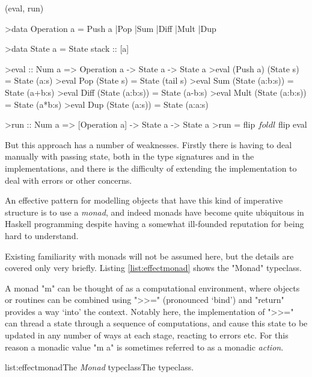 \functions(eval, run)
\begin{haskell}

>data Operation a = Push a |Pop |Sum |Diff |Mult |Dup

>data State a = State {stack :: [a]}

>eval :: Num a => Operation a -> State a -> State a
>eval (Push a) (State s) = State (a:s)
>eval Pop  (State s) = State (tail s)
>eval Sum  (State (a:b:s)) = State (a+b:s)
>eval Diff (State (a:b:s)) = State (a-b:s)
>eval Mult (State (a:b:s)) = State (a*b:s)
>eval Dup  (State (a:s)) = State (a:a:s)

>run :: Num a => [Operation a] -> State a -> State a
>run = flip $ foldl $ flip eval

\end{haskell}
\noindent But this approach has a number of weaknesses. Firstly there is having to deal manually with passing state, both in the type signatures and in the implementations, and there is the difficulty of extending the implementation to deal with errors or other concerns.

An effective pattern for modelling objects that have this kind of imperative structure is to use a \emph{monad}, and indeed monads have become quite ubiquitous in Haskell programming despite having a somewhat ill-founded reputation for being hard to understand.

Existing familiarity with monads will not be assumed here, but the details are covered only very briefly. Listing \ref{list:effectmonad} shows the "Monad" typeclass.

A monad "m" can be thought of as a computational environment, where objects or routines can be combined using ">>=" (pronounced `bind') and "return" provides a way `into' the context. Notably here, the implementation of ">>=" can thread a state through a sequence of computations, and cause this state to be updated in any number of ways at each stage, reacting to errors etc. For this reason a monadic value "m a" is sometimes referred to as a monadic \emph{action}.

\vspace{-0.5em}
\begin{listing}{list:effectmonad}{The \emph{Monad} typeclass}{The  typeclass.}{}
\end{listing}\vspace{-1.5em}

